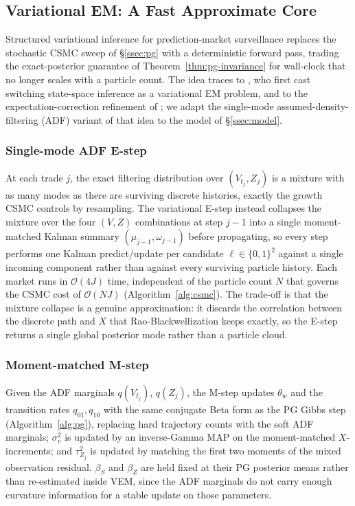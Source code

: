 \subsection{Variational EM: A Fast Approximate Core}\label{ssec:vem}

Structured variational inference for prediction-market surveillance replaces the stochastic CSMC sweep of \S\ref{ssec:pg} with a deterministic forward pass, trading the exact-posterior guarantee of Theorem~\ref{thm:pg-invariance} for wall-clock that no longer scales with a particle count. The idea traces to \citet{ghahramani2000switching}, who first cast switching state-space inference as a variational EM problem, and to the expectation-correction refinement of \citet{barber2006ec}; we adapt the single-mode assumed-density-filtering (ADF) variant of that idea to the model of \S\ref{ssec:model}.

\subsubsection{Single-mode ADF E-step}

At each trade $j$, the exact filtering distribution over $(V_{t_j}, Z_j)$ is a mixture with as many modes as there are surviving discrete histories, exactly the growth CSMC controls by resampling. The variational E-step instead collapses the mixture over the four $(V,Z)$ combinations at step $j-1$ into a single moment-matched Kalman summary $(\mu_{j-1}, \omega_{j-1})$ before propagating, so every step performs one Kalman predict/update per candidate $\ell \in \{0,1\}^2$ against a single incoming component rather than against every surviving particle history. Each market runs in $\mathcal{O}(4J)$ time, independent of the particle count $N$ that governs the CSMC cost of $\mathcal{O}(NJ)$ (Algorithm~\ref{alg:csmc}). The trade-off is that the mixture collapse is a genuine approximation: it discards the correlation between the discrete path and $X$ that Rao-Blackwellization keeps exactly, so the E-step returns a single global posterior mode rather than a particle cloud.

\subsubsection{Moment-matched M-step}

Given the ADF marginals $q(V_{t_j})$, $q(Z_j)$, the M-step updates $\theta_w$ and the transition rates $q_{01}, q_{10}$ with the same conjugate Beta form as the PG Gibbs step (Algorithm~\ref{alg:pg}), replacing hard trajectory counts with the soft ADF marginals; $\sigma^2_v$ is updated by an inverse-Gamma MAP on the moment-matched $X$-increments; and $\tau^2_{Z_j}$ is updated by matching the first two moments of the mixed observation residual. $\beta_S$ and $\beta_Z$ are held fixed at their PG posterior means rather than re-estimated inside VEM, since the ADF marginals do not carry enough curvature information for a stable update on those parameters.

